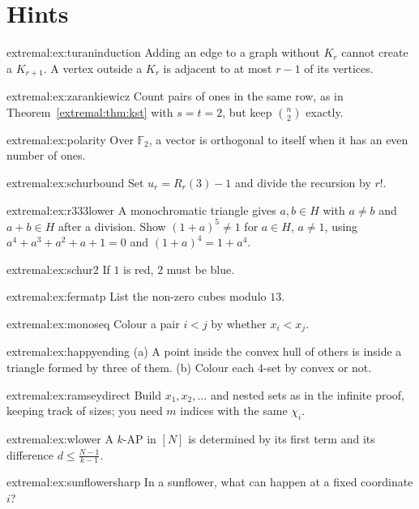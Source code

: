 \section{Hints}

\begin{hint}{extremal:ex:turaninduction}
Adding an edge to a graph without $K_r$ cannot create a $K_{r+1}$. A vertex outside a $K_r$ is adjacent to at most $r-1$ of its vertices.
\end{hint}
\begin{hint}{extremal:ex:zarankiewicz}
Count pairs of ones in the same row, as in Theorem~\ref{extremal:thm:kst} with $s=t=2$, but keep $\binom n2$ exactly.
\end{hint}
\begin{hint}{extremal:ex:polarity}
Over $\mathbb F_2$, a vector is orthogonal to itself when it has an even number of ones.
\end{hint}
\begin{hint}{extremal:ex:schurbound}
Set $u_r=R_r(3)-1$ and divide the recursion by $r!$.
\end{hint}
\begin{hint}{extremal:ex:r333lower}
A monochromatic triangle gives $a,b\in H$ with $a\ne b$ and $a+b\in H$ after a division. Show $(1+a)^5\ne1$ for $a\in H$, $a\ne1$, using $a^4+a^3+a^2+a+1=0$ and $(1+a)^4=1+a^4$.
\end{hint}
\begin{hint}{extremal:ex:schur2}
If $1$ is red, $2$ must be blue.
\end{hint}
\begin{hint}{extremal:ex:fermatp}
List the non-zero cubes modulo $13$.
\end{hint}
\begin{hint}{extremal:ex:monoseq}
Colour a pair $i<j$ by whether $x_i<x_j$.
\end{hint}
\begin{hint}{extremal:ex:happyending}
(a) A point inside the convex hull of others is inside a triangle formed by three of them. (b) Colour each $4$-set by convex or not.
\end{hint}
\begin{hint}{extremal:ex:ramseydirect}
Build $x_1,x_2,\dots$ and nested sets as in the infinite proof, keeping track of sizes; you need $m$ indices with the same $\chi_i$.
\end{hint}
\begin{hint}{extremal:ex:wlower}
A $k$-AP in $[N]$ is determined by its first term and its difference $d\le\frac{N-1}{k-1}$.
\end{hint}
\begin{hint}{extremal:ex:sunflowersharp}
In a sunflower, what can happen at a fixed coordinate $i$?
\end{hint}

